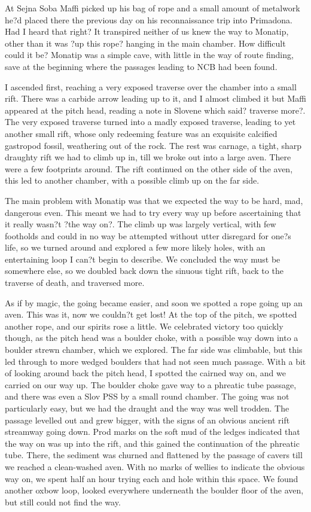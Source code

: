 \documentclass[onecolumn]{book}
\begin{document}
At Sejna Soba Maffi picked up his bag of rope and a small amount of metalwork he?d placed there the previous day on his reconnaissance trip into Primadona. Had I heard that right? It transpired neither of us knew the way to Monatip, other than it was ?up this rope? hanging in the main chamber. How difficult could it be? Monatip was a simple cave, with little in the way of route finding, save at the beginning where the passages leading to NCB had been found.

I ascended first, reaching a very exposed traverse over the chamber into a small rift. There was a carbide arrow leading up to it, and I almost climbed it but Maffi appeared at the pitch head, reading a note in Slovene which said? traverse more?. The very exposed traverse turned into a madly exposed traverse, leading to yet another small rift, whose only redeeming feature was an exquisite calcified gastropod fossil, weathering out of the rock. The rest was carnage, a tight, sharp draughty rift we had to climb up in, till we broke out into a large aven. There were a few footprints around. The rift continued on the other side of the aven, this led to another chamber, with a possible climb up on the far side. 

The main problem with Monatip was that we expected the way to be hard, mad, dangerous even. This meant we had to try every way up before ascertaining that it really wasn?t ?the way on?. The climb up was largely vertical, with few footholds and could in no way be attempted without utter disregard for one?s life, so we turned around and explored a few more likely holes, with an entertaining loop I can?t begin to describe. We concluded the way must be somewhere else, so we doubled back down the sinuous tight rift, back to the traverse of death, and traversed more.

As if by magic, the going became easier, and soon we spotted a rope going up an aven. This was it, now we couldn?t get lost! At the top of the pitch, we spotted another rope, and our spirits rose a little. We celebrated victory too quickly though, as the pitch head was a boulder choke, with a possible way down into a boulder strewn  chamber, which we explored. The far side was climbable, but this led through to more wedged boulders that had not seen much passage. With a bit of looking around back the pitch head, I spotted the cairned way on, and we carried on our way up. The boulder choke gave way to a phreatic tube passage, and there was even a Slov PSS by a small round chamber. The going was not particularly easy, but we had the draught and the way was well trodden. The passage levelled out and grew bigger, with the signs of an obvious ancient rift streamway going down. Prod marks on the soft mud of the ledges indicated that the way on was up into the rift, and this gained the continuation of the phreatic tube. There, the sediment was churned and flattened by the passage of cavers till we reached a clean-washed aven. With no marks of wellies to indicate the obvious way on, we spent half an hour trying each and hole within this space. We found another oxbow loop, looked everywhere underneath the boulder floor of the aven, but still could not find the way. 
\end{document}
